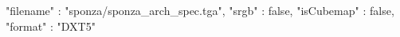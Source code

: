 { 
	"filename" : "sponza/sponza_arch_spec.tga", 
	"srgb" : false,
	"isCubemap" : false,
	"format" : "DXT5"
}